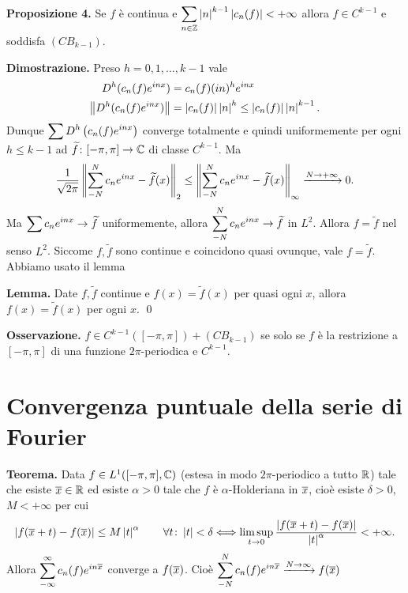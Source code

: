 \textbf{Proposizione 4.} Se $f$ è continua e $\displaystyle \sum_{n \in \mathbb Z} \left| n \right|^{k-1} \left| c_n(f) \right| < +\infty $ allora $f \in C^{k-1}$ e soddisfa $(CB_{k-1})$.


\textbf{Dimostrazione.} Preso $h=0,1,\ldots,k-1$ vale
\begin{align*}
	D^h (c_n(f) e^{inx}) & = c_n(f) (in)^h e^{inx} \\
	\left\lVert D^h (c_n(f) e^{inx}) \right\rVert & = \left| c_n(f) \right| \left| n \right|^h \leq \left| c_n(f) \right| \left| n \right|^{k-1}.
\end{align*}
Dunque $\displaystyle \sum D^h \left( c_n(f) e^{inx} \right)$ converge totalmente e quindi uniformemente per ogni $h \leq k-1$ ad $\widetilde{f} \colon  [-\pi,\pi] \to \mathbb C$ di classe $C^{k-1}$.
Ma
%
$$
	\frac{1}{\sqrt{2\pi} } \left\lVert \sum_{-N}^N c_n e^{inx} - \widetilde{f}(x) \right\rVert_2
\leq \left\lVert \sum_{-N}^N c_n e^{inx} - \widetilde{f}(x) \right\rVert_\infty \xrightarrow{N \rightarrow +\infty} 0.
$$
%
Ma $\displaystyle \sum c_n e^{inx} \to \widetilde{f}$ uniformemente, allora $\displaystyle \sum_{-N}^N c_n e^{inx} \to \widetilde{f}$ in $L^2$.
Allora $f = \tilde{f}$ nel senso $L^2$. Siccome $f,\tilde{f}$ sono continue e coincidono quasi ovunque, vale $f = \tilde{f}$.
Abbiamo usato il lemma

\vs

\textbf{Lemma.} Date $f,\tilde{f}$ continue e $f(x) = \tilde{f}(x)$ per quasi ogni $x$, allora  $f(x) = \tilde{f}(x)$ per ogni $x$.
\qed

\vs

\textbf{Osservazione.} $f \in C^{k-1}([-\pi,\pi]) + (CB_{k-1})$ se solo se $f $ è la restrizione a $[-\pi,\pi]$ di una funzione $2\pi$-periodica e $C^{k-1}$.


\section{Convergenza puntuale della serie di Fourier}

\textbf{Teorema.} Data $f \in L^1([-\pi,\pi], \mathbb C) $ (estesa in modo $2\pi$-periodico a tutto $\mathbb R$) tale che esiste $\overline{x} \in \mathbb R$ ed esiste $\alpha > 0$ tale che $f$ è $\alpha$-Holderiana in $\overline{x}$, cioè esiste $\delta > 0 $, $M < +\infty$ per cui
%
$$
\left| f(\overline{x} +t) - f(\overline{x}) \right| \leq M \left| t \right|^\alpha \qquad \forall t \colon \left| t \right| < \delta \Longleftrightarrow \limsup_{t \to 0} \frac{\left| f(\overline{x} + t) - f(\overline{x}) \right|}{\left| t \right|^\alpha } < +\infty.
$$
%
Allora $\displaystyle \sum_{-\infty}^\infty c_n(f) e^{in\overline{x}}$ converge a $f(\overline{x})$.
Cioè $\displaystyle \sum_{-N}^N c_n(f) e^{in\overline{x}}\xrightarrow{N \to \infty} f(\overline{x})$ 

